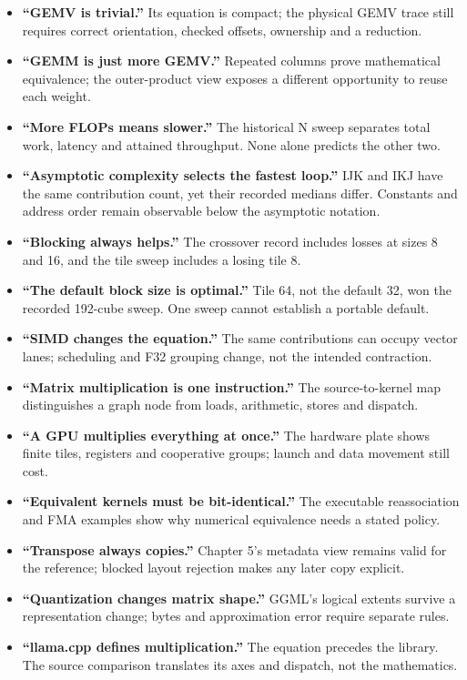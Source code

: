 \begin{itemize}
\tightlist
\item
  \textbf{``GEMV is trivial.''} Its equation is compact; the physical
  GEMV trace still requires correct orientation, checked offsets,
  ownership and a reduction.
\item
  \textbf{``GEMM is just more GEMV.''} Repeated columns prove
  mathematical equivalence; the outer-product view exposes a different
  opportunity to reuse each weight.
\item
  \textbf{``More FLOPs means slower.''} The historical N sweep separates
  total work, latency and attained throughput. None alone predicts the
  other two.
\item
  \textbf{``Asymptotic complexity selects the fastest loop.''} IJK and
  IKJ have the same contribution count, yet their recorded medians
  differ. Constants and address order remain observable below the
  asymptotic notation.
\item
  \textbf{``Blocking always helps.''} The crossover record includes
  losses at sizes 8 and 16, and the tile sweep includes a losing tile 8.
\item
  \textbf{``The default block size is optimal.''} Tile 64, not the
  default 32, won the recorded 192-cube sweep. One sweep cannot
  establish a portable default.
\item
  \textbf{``SIMD changes the equation.''} The same contributions can
  occupy vector lanes; scheduling and F32 grouping change, not the
  intended contraction.
\item
  \textbf{``Matrix multiplication is one instruction.''} The
  source-to-kernel map distinguishes a graph node from loads,
  arithmetic, stores and dispatch.
\item
  \textbf{``A GPU multiplies everything at once.''} The hardware plate
  shows finite tiles, registers and cooperative groups; launch and data
  movement still cost.
\item
  \textbf{``Equivalent kernels must be bit-identical.''} The executable
  reassociation and FMA examples show why numerical equivalence needs a
  stated policy.
\item
  \textbf{``Transpose always copies.''} Chapter 5's metadata view
  remains valid for the reference; blocked layout rejection makes any
  later copy explicit.
\item
  \textbf{``Quantization changes matrix shape.''} GGML's logical extents
  survive a representation change; bytes and approximation error require
  separate rules.
\item
  \textbf{``llama.cpp defines multiplication.''} The equation precedes
  the library. The source comparison translates its axes and dispatch,
  not the mathematics.
\end{itemize}

